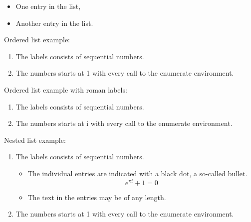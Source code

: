 \begin{itemize}
  \item One entry in the list,
  \item Another entry in the list.
\end{itemize}

Ordered list example:\noskip

\begin{enumerate}
  \item The labels consists of sequential numbers.
  \item The numbers starts at 1 with every call to the enumerate environment.
\end{enumerate}

Ordered list example with roman labels:\noskip
\begin{enumerate}[label=\roman*.]
  \item The labels consists of sequential numbers.
  \item The numbers starts at i with every call to the enumerate environment.
\end{enumerate}

Nested list example:\noskip

\begin{enumerate}
   \item The labels consists of sequential numbers.
   \begin{itemize}
     \item The individual entries are indicated with a black dot, a so-called bullet.
        \begin{equation} \label{eu_eqn_itemize}
          e^{\pi i} + 1 = 0
        \end{equation}
     \item The text in the entries may be of any length.
   \end{itemize}
   \item The numbers starts at 1 with every call to the enumerate environment.
\end{enumerate}
